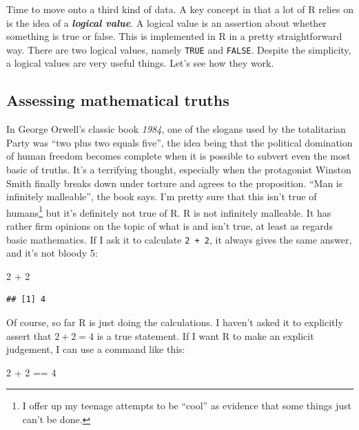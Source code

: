 \documentclass[
]{book}
\newenvironment{Shaded}{\begin{snugshade}}{\end{snugshade}}
\newcommand{\DecValTok}[1]{\textcolor[rgb]{0.00,0.00,0.81}{#1}}
\newcommand{\SpecialCharTok}[1]{\textcolor[rgb]{0.00,0.00,0.00}{#1}}
\begin{document}
Time to move onto a third kind of data. A key concept in that a lot of R relies on is the idea of a \textbf{\emph{logical value}}. A logical value is an assertion about whether something is true or false. This is implemented in R in a pretty straightforward way. There are two logical values, namely \texttt{TRUE} and \texttt{FALSE}. Despite the simplicity, a logical values are very useful things. Let's see how they work.

\hypertarget{assessing-mathematical-truths}{%
\subsection{Assessing mathematical truths}\label{assessing-mathematical-truths}}

In George Orwell's classic book \emph{1984}, one of the slogans used by the totalitarian Party was ``two plus two equals five'', the idea being that the political domination of human freedom becomes complete when it is possible to subvert even the most basic of truths. It's a terrifying thought, especially when the protagonist Winston Smith finally breaks down under torture and agrees to the proposition. ``Man is infinitely malleable'', the book says. I'm pretty sure that this isn't true of humans\footnote{I offer up my teenage attempts to be ``cool'' as evidence that some things just can't be done.} but it's definitely not true of R. R is not infinitely malleable. It has rather firm opinions on the topic of what is and isn't true, at least as regards basic mathematics. If I ask it to calculate \texttt{2\ +\ 2}, it always gives the same answer, and it's not bloody 5:

\begin{Shaded}
\begin{Highlighting}[]
\DecValTok{2} \SpecialCharTok{+} \DecValTok{2}
\end{Highlighting}
\end{Shaded}

\begin{verbatim}
## [1] 4
\end{verbatim}

Of course, so far R is just doing the calculations. I haven't asked it to explicitly assert that \(2+2 = 4\) is a true statement. If I want R to make an explicit judgement, I can use a command like this:

\begin{Shaded}
\begin{Highlighting}[]
\DecValTok{2} \SpecialCharTok{+} \DecValTok{2} \SpecialCharTok{==} \DecValTok{4}
\end{Highlighting}
\end{Shaded}
\end{document}
